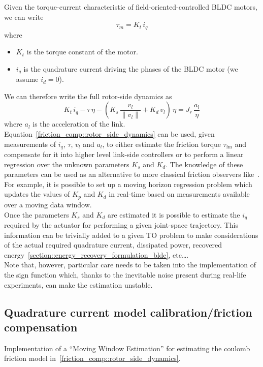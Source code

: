 \documentclass[letterpaper, 10 pt, conference]{ieeeconf}  %
\begin{document}
Given the torque-current characteristic of field-oriented-controlled BLDC motors, we can write
\begin{equation}
\tau_{m} = K_t\,i_q
\end{equation}
where 
\begin{itemize}
	\item $K_t$ is the torque constant of the motor.
	\item $i_q$ is the quadrature current driving the phases of the BLDC motor (we assume $i_d = 0$).
\end{itemize}
We can therefore write the full rotor-side dynamics as
\begin{equation}\label{friction_comp::rotor_side_dynamics}
K_t\,i_q - \tau\,\eta - \left(K_{s}\,\dfrac{v_l}{\lVert v_l\rVert} + K_{d}\,v_l\right) \, \eta = J_r\,\dfrac{a_l}{\eta}
\end{equation}
where $a_l$ is the acceleration of the link.\\
Equation~\eqref{friction_comp::rotor_side_dynamics} can be used, given measurements of $i_q$, $\tau$, $v_l$ and $a_l$, to either estimate the friction torque $\tau_{\mathrm{fm}}$ and compensate for it into higher level link-side controllers or to perform a linear regression over the unknown parameters $K_s$ and $K_d$. The knowledge of these parameters can be used as an alternative to more classical friction observers like~\cite{friction_comp::le2008friction}. For example, it is possible to set up a moving horizon regression problem which updates the values of $K_p$ and $K_d$ in real-time based on measurements available over a moving data window.\\
Once the parameters $K_s$ and $K_d$ are estimated it is possible to estimate the $i_q$ required by the actuator for performing a given joint-space trajectory. This information can be trivially added to a given TO problem to make considerations of the actual required quadrature current, dissipated power, recovered energy~\ref{section::energy_recovery_formulation_bldc}, etc\dots .\\
Note that, however, particular care needs to be taken into the implementation of the sign function which, thanks to the inevitable noise present during real-life experiments, can make the estimation unstable. 
\subsection{Quadrature current model calibration/friction compensation}\label{subsection::iq_mwe}
Implementation of a \enquote{Moving Window Estimation} for estimating the coulomb friction model in~\eqref{friction_comp::rotor_side_dynamics}.
\clearpage
\end{document}
